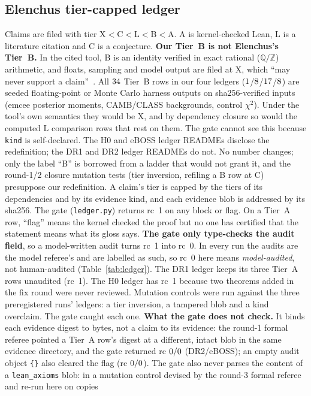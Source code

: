 \documentclass[11pt]{article}
\begin{document}
\subsection{Elenchus tier-capped ledger}\label{sec:ledger}
Claims are filed with tier X${<}$C${<}$L${<}$B${<}$A. A is kernel-checked Lean, L is a literature citation and C is a conjecture.
\textbf{Our Tier~B is not Elenchus's Tier~B.} In the cited tool, B is an identity verified in exact rational ($\mathbb{Q}/\mathbb{Z}$) arithmetic, and floats, sampling and
model output are filed at X, which ``may never support a claim''~\cite{elenchus}. All $34$ Tier~B rows in our four ledgers ($1$/$8$/$17$/$8$) are
seeded floating-point or Monte Carlo harness outputs on sha256-verified inputs (emcee posterior moments, CAMB/CLASS backgrounds, control $\chi^2$). Under the tool's own
semantics they would be X, and by dependency closure so would the computed L comparison rows that rest on them. The gate cannot see this because \texttt{kind} is self-declared.
The H0 and eBOSS ledger READMEs disclose the redefinition; the DR1 and DR2 ledger READMEs do not. No number changes; only the label ``B'' is borrowed from a ladder that
would not grant it, and the round-1/2 closure mutation tests (tier inversion, refiling a B row at C) presuppose our redefinition. A claim's tier is capped by the tiers of its dependencies and by its evidence kind, and each evidence blob is
addressed by its sha256. The gate (\texttt{ledger.py}) returns rc~1 on any block or flag. On a Tier~A row, ``flag'' means the kernel checked
the proof but no one has certified that the statement means what its gloss says. \textbf{The gate only type-checks the audit field}, so a
model-written audit turns rc~1 into rc~0. In every run the audits are the model referee's and are labelled as such, so rc~0 here means
\emph{model-audited}, not human-audited (Table~\ref{tab:ledger}). The DR1 ledger keeps its three Tier~A rows unaudited (rc~1). The H0
ledger has rc~1 because two theorems added in the fix round were never reviewed. Mutation controls were run against the three preregistered runs' ledgers:
a tier inversion, a tampered blob and a kind overclaim. The gate caught each one. \textbf{What the gate does not check.} It binds each evidence digest
to bytes, not a claim to its evidence: the round-1 formal referee pointed a Tier~A row's digest at a different, intact blob in the same evidence
directory, and the gate returned rc $0/0$ (DR2/eBOSS); an empty audit object \texttt{\{\}} also cleared the flag (rc $0/0$). The gate also never
parses the content of a \texttt{lean\_axioms} blob: in a mutation control devised by the round-3 formal referee and re-run here on copies
\end{document}
